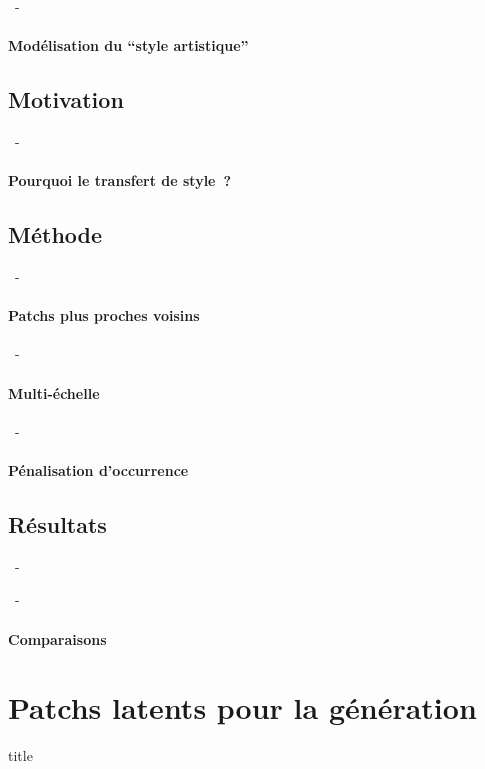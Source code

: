 \documentclass[aspectratio=169, 22pt]{beamer}
\begin{document}
\begin{frame}{\secname~- \subsecname}
  \framesubtitle{Modélisation du ``style artistique''}
\end{frame}

\subsection{Motivation}
\begin{frame}{\secname~- \subsecname}
  \framesubtitle{Pourquoi le transfert de style ?}
\end{frame}

\subsection{Méthode}
\begin{frame}{\secname~- \subsecname}
  \framesubtitle{Patchs plus proches voisins}
\end{frame}

\begin{frame}{\secname~- \subsecname}
  \framesubtitle{Multi-échelle}
\end{frame}

\begin{frame}{\secname~- \subsecname}
  \framesubtitle{Pénalisation d'occurrence}
\end{frame}

\subsection{Résultats}
\begin{frame}{\secname~- \subsecname}
\end{frame}

\begin{frame}{\secname~- \subsecname}
  \framesubtitle{Comparaisons}
\end{frame}



\section{Patchs latents pour la génération}
\begin{frame}
  \begin{beamercolorbox}[sep=15pt,center,shadow=true,rounded=true]{title}
    \LARGE\bfseries \secname
  \end{beamercolorbox}
\end{frame}
\end{document}
